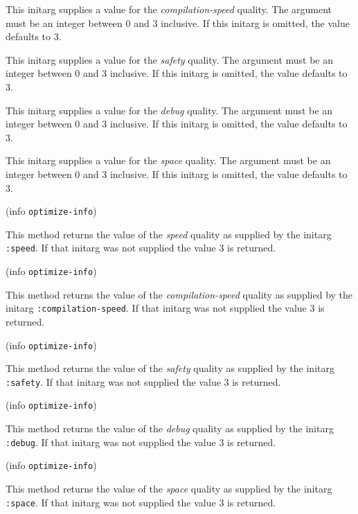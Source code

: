 
This initarg supplies a value for the \emph{compilation-speed}
quality.  The argument must be an integer between $0$ and $3$
inclusive.  If this initarg is omitted, the value defaults to $3$.


This initarg supplies a value for the \emph{safety} quality.  The
argument must be an integer between $0$ and $3$ inclusive.  If this
initarg is omitted, the value defaults to $3$.


This initarg supplies a value for the \emph{debug} quality.  The
argument must be an integer between $0$ and $3$ inclusive.  If this
initarg is omitted, the value defaults to $3$.


This initarg supplies a value for the \emph{space} quality.  The
argument must be an integer between $0$ and $3$ inclusive.  If this
initarg is omitted, the value defaults to $3$.

 {(info {\tt optimize-info})}

This method returns the value of the \emph{speed} quality as supplied
by the initarg \texttt{:speed}.  If that initarg was not supplied the
value $3$ is returned. 

 {(info {\tt optimize-info})}

This method returns the value of the \emph{compilation-speed} quality
as supplied by the initarg \texttt{:compilation-speed}.  If that
initarg was not supplied the value $3$ is returned.

 {(info {\tt optimize-info})}

This method returns the value of the \emph{safety} quality as supplied
by the initarg \texttt{:safety}.  If that initarg was not supplied the
value $3$ is returned. 

 {(info {\tt optimize-info})}

This method returns the value of the \emph{debug} quality as supplied
by the initarg \texttt{:debug}.  If that initarg was not supplied the
value $3$ is returned. 

 {(info {\tt optimize-info})}

This method returns the value of the \emph{space} quality as supplied
by the initarg \texttt{:space}.  If that initarg was not supplied the
value $3$ is returned. 

